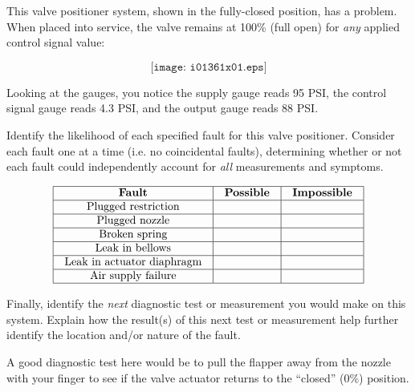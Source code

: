 

This valve positioner system, shown in the fully-closed position, has a problem.  When placed into service, the valve remains at 100\% (full open) for {\it any} applied control signal value:

$$\texttt{[image: i01361x01.eps]}$$

Looking at the gauges, you notice the supply gauge reads 95 PSI, the control signal gauge reads 4.3 PSI, and the output gauge reads 88 PSI.

Identify the likelihood of each specified fault for this valve positioner.  Consider each fault one at a time (i.e. no coincidental faults), determining whether or not each fault could independently account for {\it all} measurements and symptoms.


$$\vbox{\offinterlineskip
\halign{\strut
\vrule \quad\hfil # \ \hfil & 
\vrule \quad\hfil # \ \hfil & 
\vrule \quad\hfil # \ \hfil \vrule \cr
\noalign{\hrule}
%
{\bf Fault} & {\bf Possible} & {\bf Impossible} \cr
%
\noalign{\hrule}
%
Plugged restriction &  &  \cr
%
\noalign{\hrule}
%
Plugged nozzle &  &  \cr
%
\noalign{\hrule}
%
Broken spring &  &  \cr
%
\noalign{\hrule}
%
Leak in bellows &  &  \cr
%
\noalign{\hrule}
%
Leak in actuator diaphragm &  &  \cr
%
\noalign{\hrule}
%
Air supply failure &  &  \cr
%
\noalign{\hrule}
} %
}$$ %

Finally, identify the {\it next} diagnostic test or measurement you would make on this system.  Explain how the result(s) of this next test or measurement help further identify the location and/or nature of the fault.







A good diagnostic test here would be to pull the flapper away from the nozzle with your finger to see if the valve actuator returns to the ``closed'' (0\%) position.
 
